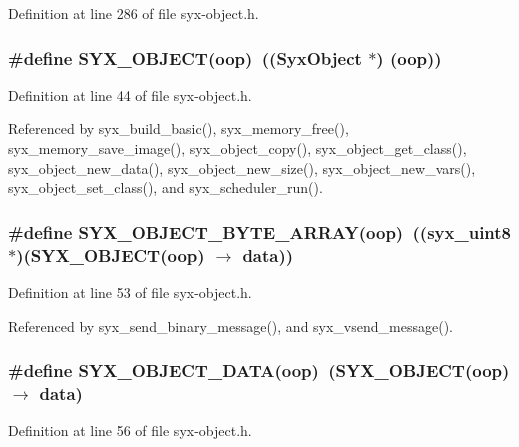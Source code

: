 Definition at line 286 of file syx-object.h.\hypertarget{syx-object_8h_cfb2a79cbeaf42326b56948d009d6719}{
\subsubsection{\setlength{\rightskip}{0pt plus 5cm}\#define SYX\_\-OBJECT(oop)~(({\bf SyxObject} $\ast$) (oop))}}
\label{syx-object_8h_cfb2a79cbeaf42326b56948d009d6719}




Definition at line 44 of file syx-object.h.

Referenced by syx\_\-build\_\-basic(), syx\_\-memory\_\-free(), syx\_\-memory\_\-save\_\-image(), syx\_\-object\_\-copy(), syx\_\-object\_\-get\_\-class(), syx\_\-object\_\-new\_\-data(), syx\_\-object\_\-new\_\-size(), syx\_\-object\_\-new\_\-vars(), syx\_\-object\_\-set\_\-class(), and syx\_\-scheduler\_\-run().\hypertarget{syx-object_8h_e935c367e62b3662eb89fcb98fb173b6}{
\subsubsection{\setlength{\rightskip}{0pt plus 5cm}\#define SYX\_\-OBJECT\_\-BYTE\_\-ARRAY(oop)~(({\bf syx\_\-uint8} $\ast$)(SYX\_\-OBJECT(oop) $\rightarrow$ data))}}
\label{syx-object_8h_e935c367e62b3662eb89fcb98fb173b6}




Definition at line 53 of file syx-object.h.

Referenced by syx\_\-send\_\-binary\_\-message(), and syx\_\-vsend\_\-message().\hypertarget{syx-object_8h_fc625eb398e3bd73c520d54112da754f}{
\subsubsection{\setlength{\rightskip}{0pt plus 5cm}\#define SYX\_\-OBJECT\_\-DATA(oop)~(SYX\_\-OBJECT(oop) $\rightarrow$ data)}}
\label{syx-object_8h_fc625eb398e3bd73c520d54112da754f}




Definition at line 56 of file syx-object.h.

